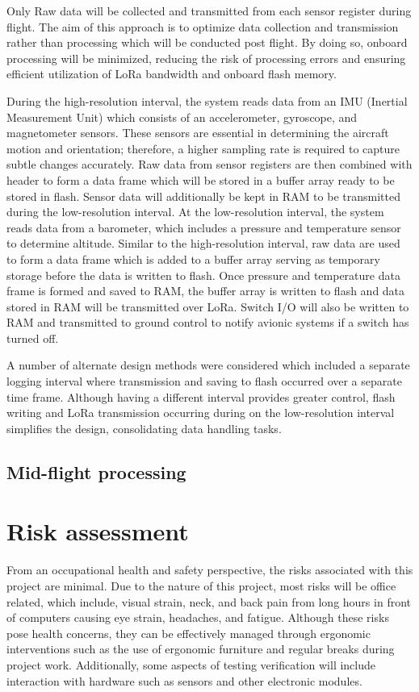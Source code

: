 Only Raw data will be collected and transmitted from each sensor register during flight. The aim of this approach is to optimize data collection and transmission rather than processing which will be conducted post flight. By doing so, onboard processing will be minimized, reducing the risk of processing errors and ensuring efficient utilization of LoRa bandwidth and onboard flash memory. 

During the high-resolution interval, the system reads data from an IMU (Inertial Measurement Unit) which consists of an accelerometer, gyroscope, and magnetometer sensors. These sensors are essential in determining the aircraft motion and orientation; therefore, a higher sampling rate is required to capture subtle changes accurately. Raw data from sensor registers are then combined with header to form a data frame which will be stored in a buffer array ready to be stored in flash. Sensor data will additionally be kept in RAM to be transmitted during the low-resolution interval.  At the low-resolution interval, the system reads data from a barometer, which includes a pressure and temperature sensor to determine altitude. Similar to the high-resolution interval, raw data are used to form a data frame which is added to a buffer array serving as temporary storage before the data is written to flash. Once pressure and temperature data frame is formed and saved to RAM, the buffer array is written to flash and data stored in RAM will be transmitted over LoRa. Switch I/O will also be written to RAM and transmitted to ground control to notify avionic systems if a switch has turned off.  

A number of alternate design methods were considered which included a separate logging interval where transmission and saving to flash occurred over a separate time frame. Although having a different interval provides greater control, flash writing and LoRa transmission occurring during on the low-resolution interval simplifies the design, consolidating data handling tasks.  

\subsection{Mid-flight processing}

\section{Risk assessment}
From an occupational health and safety perspective, the risks associated with this project are minimal. Due to the nature of this project, most risks will be office related, which include, visual strain, neck, and back pain from long hours in front of computers causing eye strain, headaches, and fatigue. Although these risks pose health concerns, they can be effectively managed through ergonomic interventions such as the use of ergonomic furniture and regular breaks during project work. Additionally, some aspects of testing verification will include interaction with hardware such as sensors and other electronic modules. 

